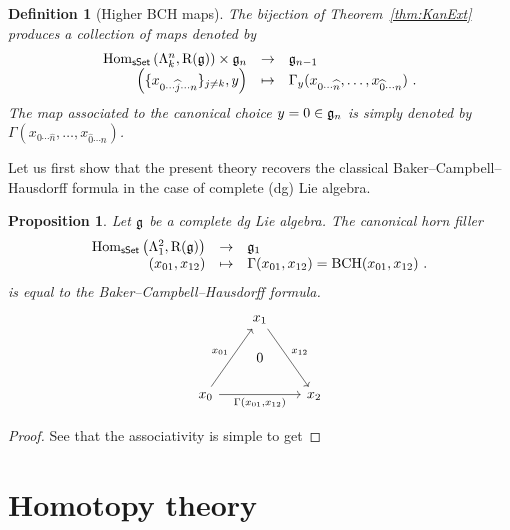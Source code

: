 \documentclass[twoside, 10pt]{amsart}
\newtheorem{definition}[lemma]{Definition}
\newtheorem{proposition}[lemma]{Proposition}
\begin{document}
\begin{definition}[Higher BCH maps]
The bijection of Theorem~\ref{thm:KanExt} produces a collection of maps denoted by 
\[
\begin{array}{rcl}
\Hom_{\sSe}\left({\Ho{k}{n}}, \R(\g)\right) \times \g_n &\to &\g_{n-1}\\
\left(
\{x_{0\cdots \widehat{j} \cdots n}\}_{j\neq k}, y\right)
&\mapsto& \Gamma_y(x_{0\cdots \widehat{n}}, \ldots, x_{\widehat{0} \cdots n})\ .
\end{array}
\]
The map associated to the canonical choice $y=0\in \g_n$ is simply denoted by $\Gamma(x_{0\cdots \widehat{n}}, \ldots, x_{\widehat{0} \cdots n})$.
\end{definition}
Let us first show that the present theory recovers the classical Baker--Campbell--Hausdorff formula in the case of complete (dg) Lie algebra. 

\begin{proposition}
Let $\g$ be a complete dg Lie algebra. The canonical horn filler 
\[
\begin{array}{rcl}
\Hom_{\sSe}\left({\Ho{1}{2}}, \R(\g)\right)  &\to &\g_{1}\\
\left(x_{01}, x_{12}
\right)
&\mapsto& \Gamma(x_{01}, x_{12})=\mathrm{BCH}(x_{01}, x_{12})\ .
\end{array}
\]
is equal to the Baker--Campbell--Hausdorff formula. 
\[\vcenter{\hbox{
\begin{tikzcd}[column sep=0.7cm, row sep=0.5cm]
 & x_1 \arrow[ddr, "x_{12}"] & \\
& 0 &  \\
x_0 \arrow[uur, "x_{01}"] \arrow[rr, "{\Gamma(x_{01},x_{12})}"'] & & x_2
 \end{tikzcd}
}}\]



\end{proposition}

\begin{proof}
See that the associativity is simple to get
\end{proof}


\section{Homotopy theory\bruno{[Bruno]}}
\end{document}
